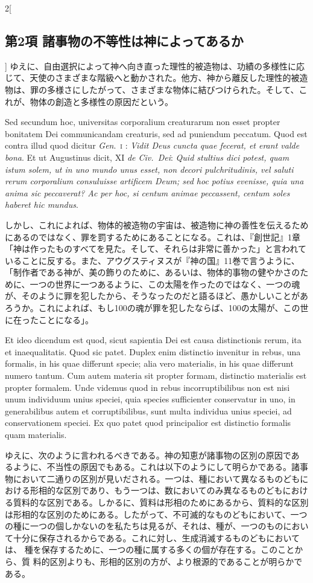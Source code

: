 \documentclass[paper=a4paper,fontsize=10pt,jafontsize=9pt,titlepage]{jlreq}
\begin{document}
\begin{paracol}{2}[\subsection{第2項 諸事物の不等性は神によってあるか}]
ゆえに、自由選択によって神へ向き直った理性的被造物は、功績の多様性に応じて、天使のさまざまな階級へと動かされた。他方、神から離反した理性的被造物は、罪の多様さにしたがって、さまざまな物体に結びつけられた。そして、これが、物体の創造と多様性の原因だという。


\switchcolumn*


Sed secundum hoc, universitas corporalium creaturarum non esset propter
bonitatem Dei communicandam creaturis, sed ad puniendum peccatum. Quod
est contra illud quod dicitur {\itshape Gen}.~{\scshape i} : {\itshape
Vidit Deus cuncta quae fecerat, et erant valde bona}. Et ut Augustinus
dicit, XI {\itshape de Civ.~Dei}: {\itshape Quid stultius dici potest,
quam istum solem, ut in uno mundo unus esset, non decori pulchritudinis,
vel saluti rerum corporalium consuluisse artificem Deum; sed hoc potius
evenisse, quia una anima sic peccaverat? Ac per hoc, si centum animae
peccassent, centum soles haberet hic mundus}.


\switchcolumn


しかし、これによれば、物体的被造物の宇宙は、被造物に神の善性を伝えるためにあるのではなく、罪を罰するためにあることになる。これは、『創世記』1章「神は作ったものすべてを見た。そして、それらは非常に善かった」と言われていることに反する。また、アウグスティヌスが『神の国』11巻で言うように、「制作者である神が、美の飾りのために、あるいは、物体的事物の健やかさのために、一つの世界に一つあるように、この太陽を作ったのではなく、一つの魂が、そのように罪を犯したから、そうなったのだと語るほど、愚かしいことがあろうか。これによれば、もし100の魂が罪を犯したならば、100の太陽が、この世に在ったことになる」。


\switchcolumn*


Et ideo dicendum est quod, sicut
sapientia Dei est causa distinctionis rerum, ita et inaequalitatis. Quod
sic patet. Duplex enim distinctio invenitur in rebus, una formalis, in
his quae differunt specie; alia vero materialis, in his quae differunt
numero tantum. Cum autem materia sit propter formam, distinctio
materialis est propter formalem. Unde videmus quod in rebus
incorruptibilibus non est nisi unum individuum unius speciei, quia
species sufficienter conservatur in uno, in generabilibus autem et
corruptibilibus, sunt multa individua unius speciei, ad conservationem
speciei. Ex quo patet quod principalior est distinctio formalis quam
materialis.


\switchcolumn


ゆえに、次のように言われるべきである。神の知恵が諸事物の区別の原因であ
るように、不当性の原因でもある。これは以下のようにして明らかである。諸事
物において二通りの区別が見いだされる。一つは、種において異なるものどもに
おける形相的な区別であり、もう一つは、数においてのみ異なるものどもにおけ
る質料的な区別である。しかるに、質料は形相のためにあるから、質料的な区別
は形相的な区別のためにある。したがって、不可滅的なものどもにおいて、一つ
の種に一つの個しかないのを私たちは見るが、それは、種が、一つのものにおい
て十分に保存されるからである。これに対し、生成消滅するものどもにおいては、
種を保存するために、一つの種に属する多くの個が存在する。このことから、質
料的区別よりも、形相的区別の方が、より根源的であることが明らかである。



\end{paracol}
\end{document}
